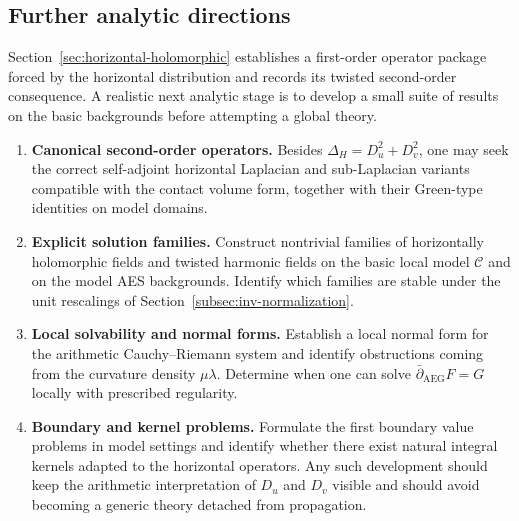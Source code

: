 \subsection{Further analytic directions}\label{subsec:outlook-analysis}

Section~\ref{sec:horizontal-holomorphic} establishes a first-order operator package forced by the horizontal distribution and records its twisted second-order consequence. A realistic next analytic stage is to develop a small suite of results on the basic backgrounds before attempting a global theory.

\begin{enumerate}
    \item \textbf{Canonical second-order operators.} Besides $\Delta_H=D_u^2+D_v^2$, one may seek the correct self-adjoint horizontal Laplacian and sub-Laplacian variants compatible with the contact volume form, together with their Green-type identities on model domains.
    \item \textbf{Explicit solution families.} Construct nontrivial families of horizontally holomorphic fields and twisted harmonic fields on the basic local model $\mathcal{C}$ and on the model AES backgrounds. Identify which families are stable under the unit rescalings of Section~\ref{subsec:inv-normalization}.
    \item \textbf{Local solvability and normal forms.} Establish a local normal form for the arithmetic Cauchy--Riemann system and identify obstructions coming from the curvature density $\mu\lambda$. Determine when one can solve $\bar\partial_{\mathrm{AEG}}F=G$ locally with prescribed regularity.
    \item \textbf{Boundary and kernel problems.} Formulate the first boundary value problems in model settings and identify whether there exist natural integral kernels adapted to the horizontal operators. Any such development should keep the arithmetic interpretation of $D_u$ and $D_v$ visible and should avoid becoming a generic theory detached from propagation.
\end{enumerate}
